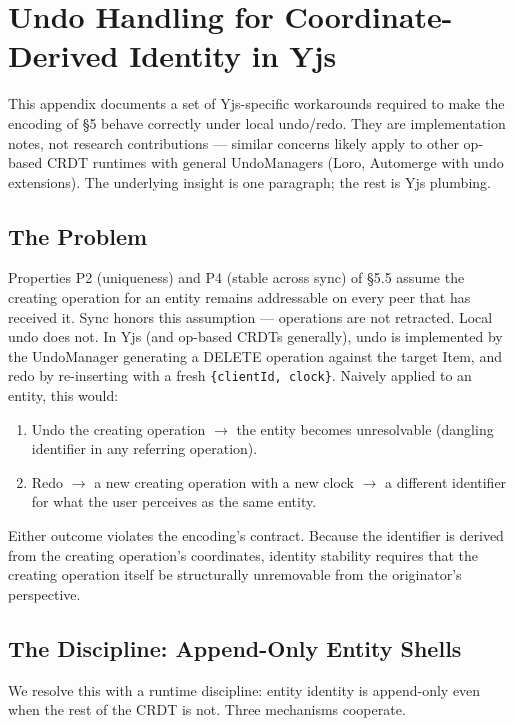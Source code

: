 \appendix

\section{Undo Handling for Coordinate-Derived Identity in Yjs}

This appendix documents a set of Yjs-specific workarounds required to make the encoding of \S5 behave correctly under local undo/redo. They are implementation notes, not research contributions --- similar concerns likely apply to other op-based CRDT runtimes with general UndoManagers (Loro, Automerge with undo extensions). The underlying insight is one paragraph; the rest is Yjs plumbing.

\subsection{The Problem}

Properties P2 (uniqueness) and P4 (stable across sync) of \S5.5 assume the creating operation for an entity remains addressable on every peer that has received it. Sync honors this assumption --- operations are not retracted. Local undo does not. In Yjs (and op-based CRDTs generally), undo is implemented by the UndoManager generating a DELETE operation against the target Item, and redo by re-inserting with a fresh \texttt{\{clientId, clock\}}. Naively applied to an entity, this would:

\begin{enumerate}
    \item Undo the creating operation $\rightarrow$ the entity becomes unresolvable (dangling identifier in any referring operation).
    \item Redo $\rightarrow$ a new creating operation with a new clock $\rightarrow$ a different identifier for what the user perceives as the same entity.
\end{enumerate}

Either outcome violates the encoding's contract. Because the identifier is derived from the creating operation's coordinates, identity stability requires that the creating operation itself be structurally unremovable from the originator's perspective.

\subsection{The Discipline: Append-Only Entity Shells}

We resolve this with a runtime discipline: entity identity is append-only even when the rest of the CRDT is not. Three mechanisms cooperate.

